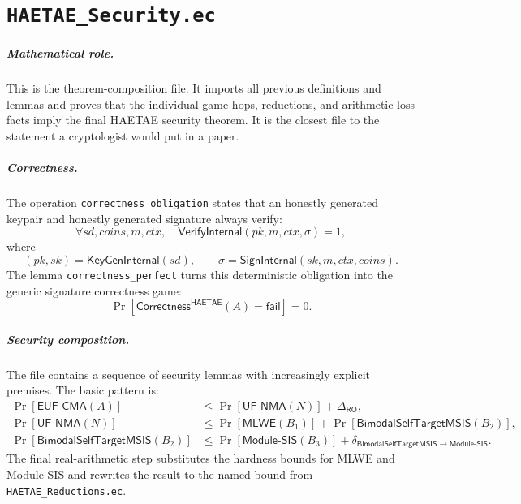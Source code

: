 \documentclass[11pt]{report}
\newcommand{\file}[1]{\nolinkurl{#1}}
\newcommand{\ec}[1]{\nolinkurl{#1}}
\newcommand{\ecchapter}[2]{\chapter{\texorpdfstring{\texttt{#1}}{#2}}}
\newcommand{\ROM}{\mathsf{RO}}
\newcommand{\HAETAE}{\mathsf{HAETAE}}
\newcommand{\EUFCMA}{\mathsf{EUF\mbox{-}CMA}}
\newcommand{\UFNMA}{\mathsf{UF\mbox{-}NMA}}
\newcommand{\MLWE}{\mathsf{MLWE}}
\newcommand{\MSIS}{\mathsf{Module\mbox{-}SIS}}
\newcommand{\BMSIS}{\mathsf{BimodalSelfTargetMSIS}}
\theoremstyle{definition}
\theoremstyle{plain}
\theoremstyle{definition}
\begin{document}
\ecchapter{HAETAE\_Security.ec}{HAETAE Security.ec}

\paragraph{Mathematical role.}
This is the theorem-composition file.  It imports all previous definitions and
lemmas and proves that the individual game hops, reductions, and arithmetic
loss facts imply the final HAETAE security theorem.  It is the closest file to
the statement a cryptologist would put in a paper.

\paragraph{Correctness.}
The operation \ec{correctness_obligation} states that an honestly generated
keypair and honestly generated signature always verify:
\[
  \forall sd,coins,m,ctx,\quad
  \mathsf{VerifyInternal}(pk,m,ctx,\sigma)=1,
\]
where
\[
  (pk,sk)=\mathsf{KeyGenInternal}(sd), \qquad
  \sigma=\mathsf{SignInternal}(sk,m,ctx,coins).
\]
The lemma \ec{correctness_perfect} turns this deterministic obligation into
the generic signature correctness game:
\[
  \Pr[\mathsf{Correctness}^{\HAETAE}(A)=\mathsf{fail}]=0.
\]

\paragraph{Security composition.}
The file contains a sequence of security lemmas with increasingly explicit
premises.  The basic pattern is:
\[
\begin{aligned}
  \Pr[\EUFCMA(A)]
  &\le \Pr[\UFNMA(N)] + \Delta_{\ROM},\\
  \Pr[\UFNMA(N)]
  &\le \Pr[\MLWE(B_1)] + \Pr[\BMSIS(B_2)],\\
  \Pr[\BMSIS(B_2)]
  &\le \Pr[\MSIS(B_3)] + \delta_{\BMSIS\to\MSIS}.
\end{aligned}
\]
The final real-arithmetic step substitutes the hardness bounds for MLWE and
Module-SIS and rewrites the result to the named bound from
\file{HAETAE_Reductions.ec}.
\end{document}
